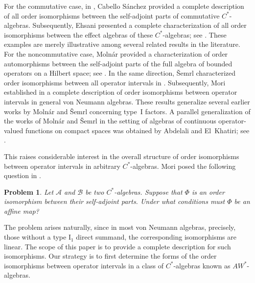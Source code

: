 \documentclass[12pt]{amsart}
\newtheorem{prob}[thm]{Problem}
\theoremstyle{definition}
\theoremstyle{remark}
\numberwithin{equation}{section}
\begin{document}
 For the commutative case, in \cite{sanchez}, Cabello S\'anchez provided a complete description of all order isomorphisms between the self-adjoint parts of commutative $C^*$-algebras. Subsequently, Ehsani presented a complete characterization of all order isomorphisms between the effect algebras of these $C^*$-algebras; see \cite{Ehsani}. These examples are merely illustrative among several related results in the literature. For the noncommutative case, Molnár provided a characterization of order automorphisms between the self-adjoint parts of the full algebra of bounded operators on a Hilbert space; see \cite{molnar}.  In the same direction, \v{S}emrl characterized order isomorphisms between all operator intervals in \cite{Semrl0, Semrl}. Subsequently, Mori established in \cite{mori} a complete description of order isomorphisms between operator intervals in general von Neumann algebras. These results generalize  several earlier works by Molnár and \v{S}emrl concerning type~$\mathrm{I}$ factors. A parallel generalization of the works of Molnár and \v{S}emrl in the setting of algebras of continuous operator-valued functions on compact spaces was obtained by Abdelali and El~Khatiri; see \cite{Our}.  

This raises considerable interest in the overall structure of order isomorphisms between operator intervals in arbitrary $C^*$-algebras.  Mori posed the following question in \cite[Section 5]{mori}.
\begin{prob}\label{problem1}
Let $\mathcal{A}$ and $\mathcal{B}$ be two $C^*$-algebras. Suppose that $\Phi$ is an order isomorphism between their self-adjoint parts. Under what conditions must $\Phi$ be an affine map?
\end{prob}

The problem arises naturally, since in most von Neumann algebras, precisely, those without a type $\mathrm{I}_1$ direct summand, the corresponding isomorphisms are linear. The scope of this paper is  to provide a complete description for such isomorphisms.  Our strategy is to first determine the forms of the order isomorphisms between operator intervals in a class of $C^*$-algebras known as $AW^*$-algebras.
\end{document}
